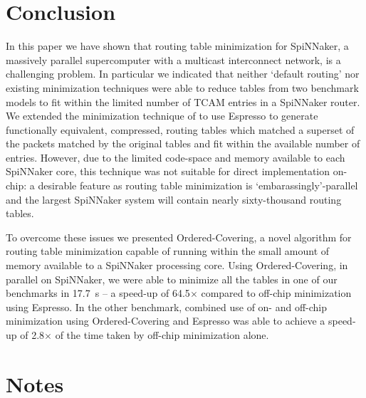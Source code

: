 \documentclass[conference]{IEEEtran}
\begin{document}
    

  \section{Conclusion}

  In this paper we have shown that routing table minimization for SpiNNaker, a massively parallel supercomputer with a multicast interconnect network, is a challenging problem.
  In particular we indicated that neither `default routing' nor existing minimization techniques were able to reduce tables from two benchmark models to fit within the limited number of TCAM entries in a SpiNNaker router.
  We extended the minimization technique of \textcite{Liu2002} to use Espresso to generate functionally equivalent, compressed, routing tables which matched a superset of the packets matched by the original tables and fit within the available number of entries.
  However, due to the limited code-space and memory available to each SpiNNaker core, this technique was not suitable for direct implementation on-chip: a desirable feature as routing table minimization is `embarassingly'-parallel and the largest SpiNNaker system will contain nearly sixty-thousand routing tables.

  To overcome these issues we presented Ordered-Covering, a novel algorithm for routing table minimization capable of running within the small amount of memory available to a SpiNNaker processing core.
  Using Ordered-Covering, in parallel on SpiNNaker, we were able to minimize all the tables in one of our benchmarks in \SI{17.7}{\second} -- a speed-up of 64.5$\times$ compared to off-chip minimization using Espresso.
  In the other benchmark, combined use of on- and off-chip minimization using Ordered-Covering and Espresso was able to achieve a speed-up of 2.8$\times$ of the time taken by off-chip minimization alone.

\section*{Notes}
\end{document}
